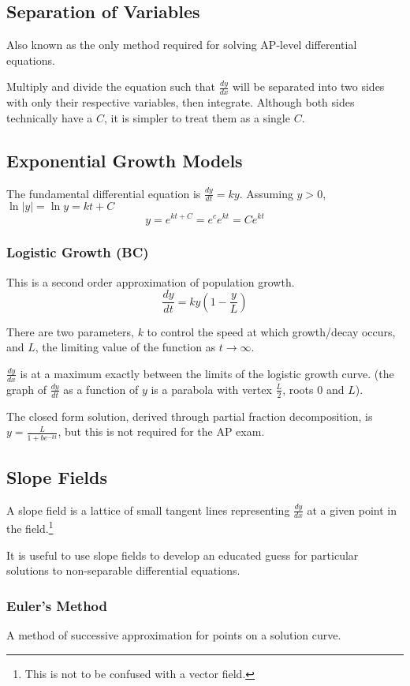 \documentclass{article}
\begin{document}
\subsection{Separation of Variables}
Also known as the only method required for solving AP-level differential equations.

Multiply and divide the equation such that $\frac{dy}{dx}$ will be separated into two sides with only their respective variables, then integrate. Although both sides technically have a $C$, it is simpler to treat them as a single $C$.

\subsection{Exponential Growth Models}
The fundamental differential equation is $\frac{dy}{dt}=ky$.
Assuming $y>0$, $\ln{|y|}=\ln{y}=kt+C$
$$y=e^{kt+C}=e^ce^{kt}=Ce^{kt}$$

\subsubsection{Logistic Growth (BC)}
This is a second order approximation of population growth.
$$\frac{dy}{dt}=ky\left(1-\frac{y}{L}\right)$$

There are two parameters, $k$ to control the speed at which growth/decay occurs, and $L$, the limiting value of the function as $t\to\infty$.

$\frac{dy}{dx}$ is at a maximum exactly between the limits of the logistic growth curve. (the graph of $\frac{dy}{dt}$ as a function of $y$ is a parabola with vertex $\frac{L}{2}$, roots $0$ and $L$).

The closed form solution, derived through partial fraction decomposition, is $y=\frac{L}{1+be^{-kt}}$, but this is not required for the AP exam.

\subsection{Slope Fields}
A slope field is a lattice of small tangent lines representing $\frac{dy}{dx}$ at a given point in the field.\footnote{This is not to be confused with a vector field.}

It is useful to use slope fields to develop an educated guess for particular solutions to non-separable differential equations.

\subsubsection{Euler's Method}
A method of successive approximation for points on a solution curve.
\end{document}
